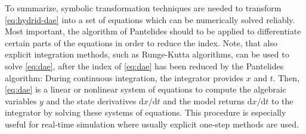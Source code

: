 To summarize, symbolic transformation techniques are needed to transform \eqref{eq:hydrid-dae} into a set of equations which can be numerically solved reliably.
Most important, the algorithm of Pantelides should to be applied to differentiate certain parts of the equations in order to reduce the index.
Note, that also explicit integration methods, such as Runge-Kutta algorithms, can be used to solve \eqref{eq:dae}, after the index of \eqref{eq:dae} has been reduced by the Pantelides algorithm: During continuous integration, the integrator provides $x$ and $t$.
Then, \eqref{eq:dae} is a linear or nonlinear system of equations to compute the algebraic variables $y$ and the state derivatives $\mathrm{d}x/\mathrm{d}t$ and the model returns $\mathrm{d}x/\mathrm{d}t$ to the integrator by solving these systems of equations.
This procedure is especially useful for real-time simulation where usually explicit one-step methods are used.

